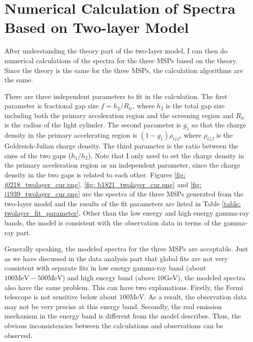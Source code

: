 \documentclass[12pt]{report}
\begin{document}
  \section{Numerical Calculation of Spectra Based on Two-layer Model}
    After understanding the theory part of the two-layer model, 
    I can then do numerical calculations of the spectra for the three MSPs
    based on the theory. Since the theory is the same for the three MSPs, the 
    calculation algorithms are the same. 

    There are three independent parameters to fit in the calculation. 
    The first parameter is fractional gap size $f=h_{2}/R_{lc}$, where $h_{2}$ is the 
    total gap size including both the primary acceleration region and the screening region 
    and $R_{lc}$ is the radius of the light cylinder. The second parameter is $g_{1}$ so that
    the charge density in the primary accelerating region is $\left(1-g_{1}\right) \rho_{GJ}$, 
    where $\rho_{GJ}$ is the Goldreich-Julian charge density. The third parameter is the ratio 
    between the sizes of the two gaps ($h_{1}/h_{2}$). Note that I only need to set the charge 
    density in the primary acceleration region as an independent parameter, since the charge 
    density in the two gaps is related to each other. Figures 
    \ref{fig: j0218_twolayer_cur.png}, \ref{fig: b1821_twolayer_cur.png} and 
    \ref{fig: j1939_twolayer_cur.png}
    are the spectra of the three MSPs generated from the two-layer model and the results of the 
    fit parameters are listed in Table \ref{table: twolayer_fit_parameter}. Other than the 
    low energy and high energy gamma-ray bands, the model is consistent with the observation 
    data in terms of the gamma-ray part. 

    Generally speaking, the modeled spectra for the three MSPs are acceptable. Just as 
    we have discussed in the data analysis part that global fits are not very consistent 
    with separate fits in low energy gamma-ray band (about $100\mbox{MeV} - 500\mbox{MeV}$) 
    and high energy band (above $10 \mbox{GeV}$), the modeled spectra also have the same 
    problem. This can have two explanations. Firstly, the Fermi telescope is not sensitive 
    below about $100 \mbox{MeV}$. As a result, the observation data may not be very precise
    at this energy band. Secondly, the real emission mechanism in the energy band is different 
    from the model describes. Thus, the obvious inconsistencies between the calculations 
    and observations can be observed.
\end{document}
